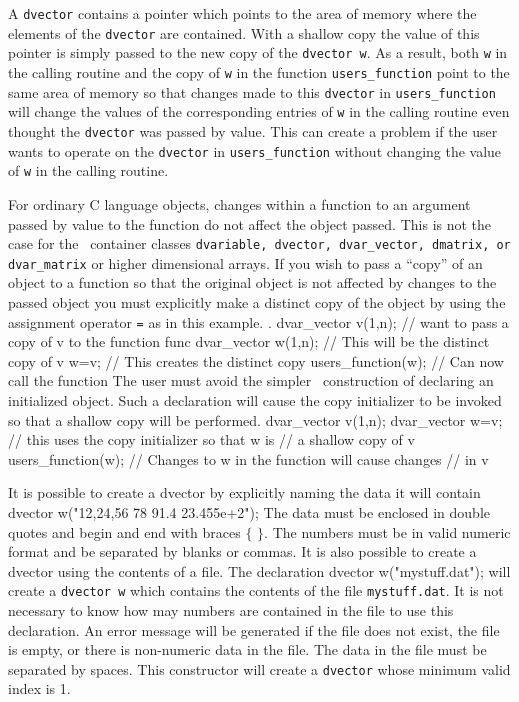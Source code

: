 \documentclass[12pt]{book}
\begin{document}
A {\tt dvector} contains a pointer which points to the area of memory
where the elements of the {\tt dvector} are contained. With a shallow
copy the value of this pointer is simply passed to the new copy of
the {\tt dvector w}. As a result, both {\tt w} in the calling routine
and the copy of {\tt w} in the function {\tt users\_function} 
point to the same area of memory so that changes made to
this {\tt dvector} in {\tt users\_function} will change the values of
the corresponding entries of {\tt w} in the calling routine even
thought the {\tt dvector} was passed by value. This can create a
problem if the user wants to operate on the {\tt dvector} in 
{\tt users\_function} without changing the value of {\tt w} in the
calling routine. 

For ordinary C language objects,  
changes within a function to an argument passed by value to the
 function do not  affect the object passed.  This is not the case
for the \AD\ container classes {\tt dvariable, dvector, dvar\_vector, dmatrix,
or dvar\_matrix} or higher dimensional arrays. 
If you wish to pass a ``copy'' of an object to a function
so that the original object is not affected by changes to the
passed object you must explicitly make a distinct copy of the object
by using the assignment operator {\tt =} as in this example.
.
\beginexamplea
dvar_vector v(1,n);  // want to pass a copy of v to the function func
dvar_vector w(1,n);  // This will be the distinct copy of v
w=v;                 // This creates the distinct copy
users_function(w);             // Can now call the function
\endexample
The user must avoid the simpler \cplus\ construction
of declaring an initialized object. Such a declaration
will cause the copy initializer to be invoked so that a shallow
copy will be performed.
\beginexamplea
dvar_vector v(1,n);  
dvar_vector w=v;     // this uses the copy initializer so that w is
                     // a shallow copy of v 
users_function(w);   // Changes to w in the function will cause changes 
                     // in v
\endexample

It is possible to create a dvector by explicitly naming the
data it will contain 
\beginexamplea
dvector w("{12,24,56 78 91.4 23.455e+2}"); 
\endexample
The data must be enclosed in double quotes and begin and end with
braces $\{$ $\}$. The numbers must be in valid numeric
format and be separated by blanks or commas. 
It is also possible to create a dvector using the contents of a file.
The declaration
\beginexamplea
dvector w("mystuff.dat");
\endexample
\noindent will create a {\tt dvector w} which contains the contents of
the file {\tt mystuff.dat}. It is not necessary to know how may numbers
are contained in the file to use this declaration. 
An error message will be generated if
the file does not exist, the file is empty, or there is non-numeric data in the
file. The data in the file must be separated by spaces. 
This constructor will create a {\tt dvector} whose minimum valid
index is 1.
\end{document}
